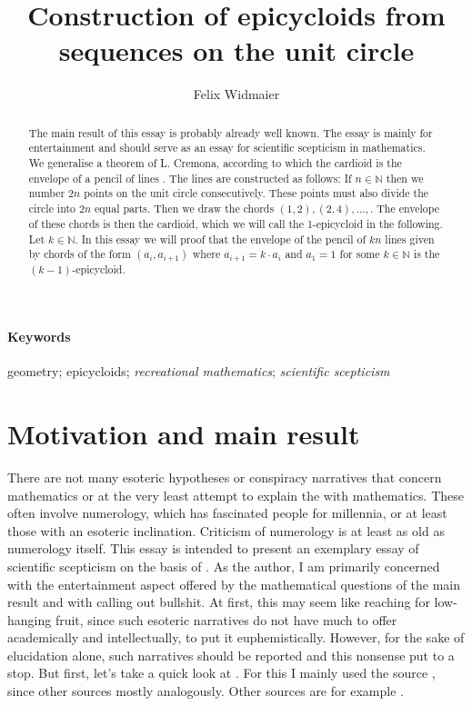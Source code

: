 \documentclass{article}
\title{Construction of epicycloids from sequences on the unit circle}
\author{Felix Widmaier}
\date{}
\newcommand{\N}{\mathbb{N}}
\begin{document}
\maketitle

\begin{abstract} 
\noindent
The main result of this essay is probably already well known. The essay is mainly for entertainment and should serve as an essay 
for scientific scepticism in mathematics. We generalise a theorem of L. Cremona, according to which the cardioid is the envelope of 
a pencil of lines \cite{cremona}. The lines are constructed as follows: If $n\in\mathbb{N}$ then we number $2n$ points on the 
unit circle consecutively. These points must also divide the circle into $2n$ equal parts. Then we draw the chords 
$(1,2), (2,4),\ldots,$. The envelope of these chords is then the cardioid, which we will call the 1-epicycloid in the following. 
Let $k\in\N$. In this essay we will proof that the envelope of the pencil of $kn$ lines given by chords of the form 
$(a_i, a_{i+1})$ where $a_{i+1} = k\cdot a_i$  and $a_1 =1$ for some $k\in\mathbb{N}$ is the $(k-1)$-epicycloid.
\end{abstract}

\noindent\paragraph{Keywords}{geometry; epicycloids; \textit{recreational mathematics}; \textit{scientific scepticism}}\\


\section{Motivation and main result}
There are not many esoteric hypotheses or conspiracy narratives that concern mathematics or at the very least attempt to explain the  
with mathematics. These often involve numerology, which has fascinated people for millennia, or at least those with an esoteric inclination. 
Criticism of numerology is at least as old as numerology itself. This essay is intended to present an exemplary essay of scientific scepticism 
on the basis of . As the author, I am primarily concerned with the entertainment aspect offered by the mathematical questions 
of the main result and with calling out bullshit. At first, this may seem like reaching for low-hanging fruit, since such esoteric narratives do 
not have much to offer academically and intellectually, to put it euphemistically. However, for the sake of elucidation alone, such narratives 
should be reported and this nonsense put to a stop. But first, let's take a quick look at . For this I mainly used the 
source \cite{omnia}, since other sources mostly  analogously. Other sources are for example \cite{powell,steinhauser}.\newline
\end{document}
